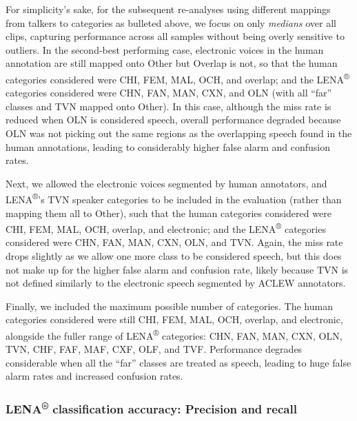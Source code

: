 \documentclass[english,table,man,floatsintext]{apa6}
\begin{document}
For simplicity's sake, for the subsequent re-analyses using different mappings from talkers to categories as bulleted above, we focus on only \emph{medians} over all clips, capturing performance across all samples without being overly sensitive to outliers. In the second-best performing case, electronic voices in the human annotation are still mapped onto Other but Overlap is not, so that the human categories considered were CHI, FEM, MAL, OCH, and overlap; and the LENA\textsuperscript{®} categories considered were CHN, FAN, MAN, CXN, and OLN (with all \enquote{far} classes and TVN mapped onto Other). In this case, although the miss rate is reduced when OLN is considered speech, overall performance degraded because OLN was not picking out the same regions as the overlapping speech found in the human annotations, leading to considerably higher false alarm and confusion rates.

Next, we allowed the electronic voices segmented by human annotators, and LENA\textsuperscript{®}'s TVN speaker categories to be included in the evaluation (rather than mapping them all to Other), such that the human categories considered were CHI, FEM, MAL, OCH, overlap, and electronic; and the LENA\textsuperscript{®} categories considered were CHN, FAN, MAN, CXN, OLN, and TVN. Again, the miss rate drops slightly as we allow one more class to be considered speech, but this does not make up for the higher false alarm and confusion rate, likely because TVN is not defined similarly to the electronic speech segmented by ACLEW annotators.

Finally, we included the maximum possible number of categories. The human categories considered were still CHI, FEM, MAL, OCH, overlap, and electronic, alongside the fuller range of LENA\textsuperscript{®} categories: CHN, FAN, MAN, CXN, OLN, TVN, CHF, FAF, MAF, CXF, OLF, and TVF. Performance degrades considerable when all the \enquote{far} classes are treated as speech, leading to huge false alarm rates and increased confusion rates.

\hypertarget{lena-classification-accuracy-precision-and-recall}{%
\subsubsection{\texorpdfstring{LENA\textsuperscript{®} classification accuracy: Precision and recall}{LENA® classification accuracy: Precision and recall}}\label{lena-classification-accuracy-precision-and-recall}}
\end{document}
